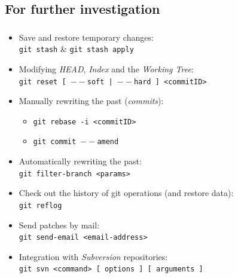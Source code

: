 \subsection{For further investigation}
\begin{frame}
  \frametitle{\insertsubsection}

  \begin{itemize}
  \item Save and restore temporary changes:\\
    \texttt{git stash} \& \texttt{git stash apply}
    \vspacing
  \item Modifying \textit{HEAD}, \textit{Index} and the \textit{Working Tree}:\\
    \texttt{git reset [ $--$soft | $--$hard ] <commitID>}
    \vspacing
  \item Manually rewriting the past (\textit{commits}):\\
    \begin{itemize}
    \item \texttt{git rebase -i <commitID>}
    \item \texttt{git commit $--$amend}
    \end{itemize}
  \item Automatically rewriting the past:\\
    \texttt{git filter-branch <params>}
    \vspacing
  \item Check out the history of git operations (and restore data):\\
    \texttt{git reflog}
    \vspacing
  \item Send patches by mail:\\
    \texttt{git send-email <email-address>}
    \vspacing
  \item Integration with \textit{Subversion} repositories:\\
    \texttt{git svn <command> [ options ] [ arguments ]}
    \vspacing
  \end{itemize}
\end{frame}

